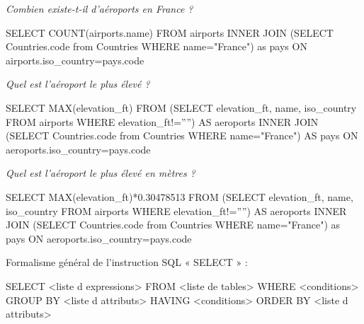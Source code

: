 \documentclass[10pt]{article}
\begin{document}
\begin{exemple}
\textit{Combien existe-t-il d'aéroports en France ?}

\begin{envsql}
\begin{sql}
SELECT COUNT(airports.name) 
        FROM airports 
    INNER JOIN 
        (SELECT Countries.code from Countries WHERE name="France") as pays 
    ON airports.iso_country=pays.code
\end{sql}
\end{envsql}

\textit{Quel est l'aéroport le plus élevé ?}
\begin{envsql}
\begin{sql}
SELECT MAX(elevation_ft) FROM 
    (SELECT elevation_ft, name, iso_country FROM airports WHERE elevation_ft!='''') AS aeroports
    INNER JOIN 
    (SELECT Countries.code from Countries WHERE name="France") AS pays     
        ON aeroports.iso_country=pays.code
\end{sql}
\end{envsql}

\textit{Quel est l'aéroport le plus élevé en mètres ?}
\begin{envsql}
\begin{sql}
SELECT MAX(elevation_ft)*0.30478513 FROM 
    (SELECT elevation_ft, name, iso_country FROM airports WHERE elevation_ft!='''') AS aeroports 
    INNER JOIN 
    (SELECT Countries.code from Countries WHERE name="France") as pays 
        ON aeroports.iso_country=pays.code
\end{sql}
\end{envsql}

\end{exemple}
\newpage


\begin{rem}
Formalisme général de l’instruction SQL « SELECT » :
\begin{envsql}
\begin{sql}
SELECT <liste d expressions> 
    FROM <liste de tables> 
    WHERE <conditions> 
    GROUP BY <liste d attributs> 
    HAVING <conditions> 
    ORDER BY <liste d attributs> 
\end{sql}
\end{envsql}
\end{rem}

\begin{thebibliography}{2}
\end{thebibliography}
\end{document}
